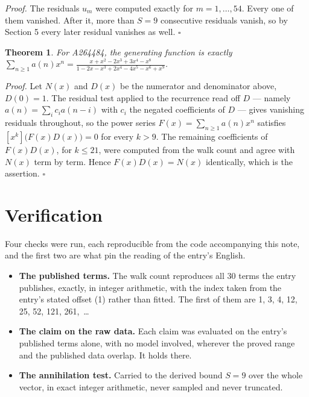 \documentclass[11pt]{article}
\newtheorem{theorem}{Theorem}
\theoremstyle{definition}
\begin{document}
{\itshape Proof.} The residuals $u_m$ were computed exactly for $m = 1,\dots,54$. Every one of them vanished. After it, more than $S = 9$ consecutive residuals vanish, so by Section 5 every later residual vanishes as well. $\square$

\begin{theorem} For A264484, the generating function is exactly $\sum_{n\ge 1} a(n)x^n = \frac{x + x^{2} - 2x^{3} + 3x^{4} - x^{8}}{1 - 2x - x^{3} + 2x^{4} - 4x^{5} - x^{6} + x^{9}}$.\end{theorem}

{\itshape Proof.} Let $N(x)$ and $D(x)$ be the numerator and denominator above, $D(0)=1$. The residual test applied to the recurrence read off $D$ --- namely $a(n) = \sum_i c_i a(n-i)$ with $c_i$ the negated coefficients of $D$ --- gives vanishing residuals throughout, so the power series $F(x)=\sum_{n\ge 1}a(n)x^n$ satisfies $[x^k]\bigl(F(x)D(x)\bigr) = 0$ for every $k > 9$. The remaining coefficients of $F(x)D(x)$, for $k \le 21$, were computed from the walk count and agree with $N(x)$ term by term. Hence $F(x)D(x) = N(x)$ identically, which is the assertion. $\square$

\section{Verification}

Four checks were run, each reproducible from the code accompanying this note, and the first two are what pin the reading of the entry's English.

\begin{itemize}

\item {\bfseries The published terms.} The walk count reproduces all 30 terms the entry publishes, exactly, in integer arithmetic, with the index taken from the entry's stated offset (1) rather than fitted. The first of them are 1, 3, 4, 12, 25, 52, 121, 261,~\dots

\item {\bfseries The claim on the raw data.} Each claim was evaluated on the entry's published terms alone, with no model involved, wherever the proved range and the published data overlap. It holds there.

\item {\bfseries The annihilation test.} Carried to the derived bound $S = 9$ over the whole vector, in exact integer arithmetic, never sampled and never truncated.

\end{itemize}
\end{document}

